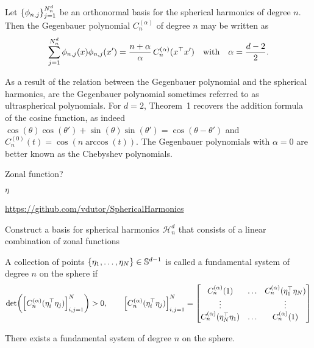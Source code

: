 \begin{theorem}
    \label{theorem:addition}
    Let $\{\phi_{n,j}\}_{j=1}^{N^d_n}$ be an orthonormal basis for the spherical harmonics of degree $n$. Then the Gegenbauer polynomial $C_n^{(\alpha)}$ of degree $n$ may be written as
\begin{equation}
    \sum_{j=1}^{N^d_n} \phi_{n, j}(x) \phi _{n, j}(x') = \frac{n + \alpha}{\alpha}\,
    C_n^{(\alpha)}(x^{\top} x')\quad\text{with}\quad \alpha = \frac{d-2}{2}.
\end{equation}
\end{theorem}
As a result of the relation between the Gegenbauer polynomial and the spherical harmonics, are the Gegenbauer polynomial sometimes referred to as ultraspherical polynomials. For $d=2$, Theorem~1 recovers the addition formula of the cosine function, as indeed $\cos(\theta) \cos(\theta') + \sin(\theta) \sin(\theta') = \cos(\theta - \theta')$ and $C_n^{(0)}(t) = \cos(n \arccos(t))$. The Gegenbauer polynomials with $\alpha=0$ are better known as the Chebyshev polynomials.

Zonal function?

$\eta$

\url{https://github.com/vdutor/SphericalHarmonics}

Construct a basis for spherical harmonics $\mathcal{H}_n^d$ that consists of a linear combination of zonal functions 

\begin{definition}
    A collection of points $\{\eta_1, \ldots, \eta_N \} \in \mathbb{S}^{d-1}$ is called a fundamental system of degree $n$ on the sphere if
    \begin{equation}
        \textrm{det}\left({\left[C_n^{(\alpha)}(\eta_i\transpose\eta_j)\right]_{i,j=1}^N}\right) > 0,\qquad
        {\left[C_n^{(\alpha)}(\eta_i\transpose\eta_j)\right]_{i,j=1}^N} = 
        \begin{bmatrix}
            C_n^{(\alpha)}(1) & \ldots & C_n^{(\alpha)}(\eta_1\transpose\eta_N) \\
            \vdots & & \vdots \\
            C_n^{(\alpha)}(\eta_N\transpose\eta_1) & \ldots & C_n^{(\alpha)}(1)
        \end{bmatrix}
    \end{equation}
\end{definition}

\begin{lemma}
    There exists a fundamental system of degree $n$ on the sphere.
\end{lemma}


